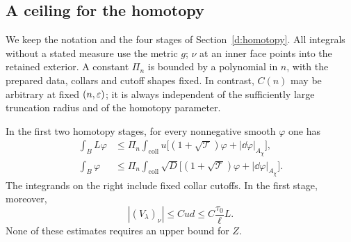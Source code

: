 \subsection{A ceiling for the homotopy}\label{e:ceiling-section}

We keep the notation and the four stages of Section~\ref{d:homotopy}.
All integrals without a stated measure use the metric $g$; $\nu$ at an
inner face points into the retained exterior.  A constant $\Pi_n$ is
bounded by a polynomial in $n$, with the prepared data, collars and
cutoff shapes fixed.  In contrast, $C(n)$ may be arbitrary at fixed
$(n,\varepsilon)$; it is always independent of the sufficiently large
truncation radius and of the homotopy parameter.

\begin{lemma}\label{e:weighted-trace}
In the first two homotopy stages, for every nonnegative smooth
$\varphi$ one has
\begin{align}
 \int_B L\varphi
 &\le \Pi_n\int_{\mathrm{coll}}u
 \bigl[(1+\sqrt{\mathcal T})\varphi+
                         |\dd\varphi|_{A_\chi}\bigr],
 \label{e:weighted-trace-eq}\\
 \int_B \varphi
 &\le \Pi_n\int_{\mathrm{coll}}\sqrt D
 \bigl[(1+\sqrt{\mathcal T})\varphi+
                         |\dd\varphi|_{A_\chi}\bigr].
 \label{e:unweighted-trace}
\end{align}
The integrands on the right include fixed collar cutoffs.  In the first
stage, moreover,
\begin{equation}\label{e:small-boundary-flux}
 |(V_\lambda)_\nu|\le Cud
                 \le C\frac{\tau_0}{\ell}L.
\end{equation}
None of these estimates requires an upper bound for $Z$.
\end{lemma}

